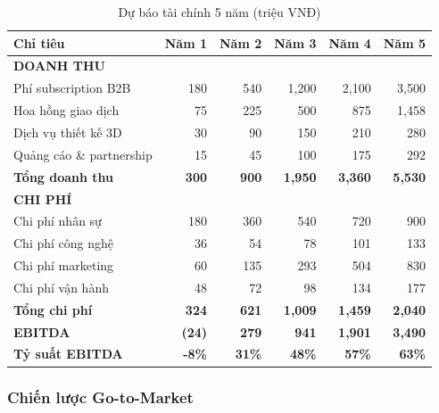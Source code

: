 \documentclass[12pt,a4paper]{article}
\begin{document}
\begin{table}[H]
\centering
\caption{Dự báo tài chính 5 năm (triệu VNĐ)}
\label{tab:financial-forecast}
\begin{tabular}{@{}lrrrrr@{}}
\toprule
\textbf{Chỉ tiêu} & \textbf{Năm 1} & \textbf{Năm 2} & \textbf{Năm 3} & \textbf{Năm 4} & \textbf{Năm 5} \\
\midrule
\textbf{DOANH THU} & & & & & \\
Phí subscription B2B & 180 & 540 & 1,200 & 2,100 & 3,500 \\
Hoa hồng giao dịch & 75 & 225 & 500 & 875 & 1,458 \\
Dịch vụ thiết kế 3D & 30 & 90 & 150 & 210 & 280 \\
Quảng cáo \& partnership & 15 & 45 & 100 & 175 & 292 \\
\textbf{Tổng doanh thu} & \textbf{300} & \textbf{900} & \textbf{1,950} & \textbf{3,360} & \textbf{5,530} \\
\midrule
\textbf{CHI PHÍ} & & & & & \\
Chi phí nhân sự & 180 & 360 & 540 & 720 & 900 \\
Chi phí công nghệ & 36 & 54 & 78 & 101 & 133 \\
Chi phí marketing & 60 & 135 & 293 & 504 & 830 \\
Chi phí vận hành & 48 & 72 & 98 & 134 & 177 \\
\textbf{Tổng chi phí} & \textbf{324} & \textbf{621} & \textbf{1,009} & \textbf{1,459} & \textbf{2,040} \\
\midrule
\textbf{EBITDA} & \textbf{(24)} & \textbf{279} & \textbf{941} & \textbf{1,901} & \textbf{3,490} \\
\textbf{Tỷ suất EBITDA} & \textbf{-8\%} & \textbf{31\%} & \textbf{48\%} & \textbf{57\%} & \textbf{63\%} \\
\bottomrule
\end{tabular}
\end{table}

\subsubsection{Chiến lược Go-to-Market}
\end{document}
